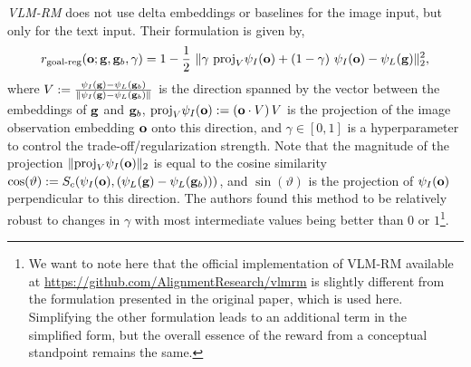 \emph{VLM-RM} does not use delta embeddings or baselines for the image input, but only for the text input.
Their formulation is given by,
\begin{equation}
    \label{eq:vlmrm}
    r_{\text{goal-reg}}(\bfo; \bfg, \bfg_b, \gamma) = 1 - \dfrac{1}{2}\ \norm{\gamma\ \text{proj}_{V}\psi_I(\bfo) + (1 - \gamma)\ \psi_I(\bfo) - \psi_L(\bfg)}^2_2,
\end{equation}
where \(V := \frac{\psi_I(\mathbf{g}) - \psi_L(\mathbf{g}_b)}{\lVert\psi_I(\mathbf{g}) - \psi_L(\mathbf{g}_b)\rVert}\) is the direction spanned by the vector between the embeddings of \(\mathbf{g}\) and \(\mathbf{g}_b\), \(\text{proj}_{V}\psi_I(\mathbf{o}) := (\mathbf{o} \cdot V)\,V\) is the projection of the image observation embedding \(\mathbf{o}\) onto this direction, and \(\gamma \in [0, 1]\) is a hyperparameter to control the trade-off/regularization strength.
Note that the magnitude of the projection \(\lVert\text{proj}_{V}\psi_I(\mathbf{o})\rVert_2\) is equal to the cosine similarity \(\cos(\vartheta) := S_c(\psi_I(\mathbf{o}), (\psi_L(\mathbf{g}) - \psi_L(\mathbf{g}_b)))\), and \(\sin(\vartheta)\) is the projection of \(\psi_I(\mathbf{o})\) perpendicular to this direction.
The authors found this method to be relatively robust to changes in \(\gamma\) with most intermediate values being better than \(0\) or \(1\)\footnote{We want to note here that the official implementation of VLM-RM available at \url{https://github.com/AlignmentResearch/vlmrm} is slightly different from the formulation presented in the original paper, which is used here. Simplifying the other formulation leads to an additional term in the simplified form, but the overall essence of the reward from a conceptual standpoint remains the same.}.
% 
\vspace{-1.5pt}
